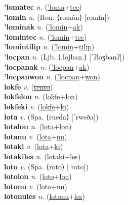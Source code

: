 \textbf{'lomatec} \textit{n.} (\hyperref['loma]{'loma}+\hyperref[tec]{tec})
 \label{'lomatec} \\
\textbf{'lomin} \textit{n.} (Ron. ⟨român⟩ [romɨn])
 \label{'lomin} \\
\textbf{'lominak} \textit{n.} (\hyperref['lomin]{'lomin}+\hyperref[ak]{ak})
 \label{'lominak} \\
\textbf{'lomintec} \textit{n.} (\hyperref['lomin]{'lomin}+\hyperref[tec]{tec})
 \label{'lomintec} \\
\textbf{'lomintilip} \textit{n.} (\hyperref['lomin]{'lomin}+\hyperref[tilip]{tilip})
 \label{'lomintilip} \\
\textbf{'locpan} \textit{n.} (Ljb. ⟨.lojban.⟩ [ˈʔloʒbanʔ])
 \label{'locpan} \\
\textbf{'locpanak} \textit{n.} (\hyperref['locpan]{'locpan}+\hyperref[ak]{ak})
 \label{'locpanak} \\
\textbf{'locpanwon} \textit{n.} (\hyperref['locpan]{'locpan}+\hyperref[won]{won})
 \label{'locpanwon} \\
\textbf{lokfe} \textit{v.} (\hyperref[tenso]{\sout{tenso}})
 \label{lokfe} \\
\textbf{lokfelon} \textit{n.} (\hyperref[lokfe]{lokfe}+\hyperref[lon]{lon})
 \label{lokfelon} \\
\textbf{lokfeki} \textit{v.} (\hyperref[lokfe]{lokfe}+\hyperref[ki]{ki})
 \label{lokfeki} \\
\textbf{lota} \textit{v.} (Spa. ⟨rueda⟩ [ˈrweða])
 \label{lota} \\
\textbf{lotalon} \textit{n.} (\hyperref[lota]{lota}+\hyperref[lon]{lon})
 \label{lotalon} \\
\textbf{lotanu} \textit{v.} (\hyperref[lota]{lota}+\hyperref[nu]{nu})
 \label{lotanu} \\
\textbf{lotaki} \textit{v.} (\hyperref[lota]{lota}+\hyperref[ki]{ki})
 \label{lotaki} \\
\textbf{lotakiles} \textit{n.} (\hyperref[lotaki]{lotaki}+\hyperref[les]{les})
 \label{lotakiles} \\
\textbf{loto} \textit{v.} (Spa. ⟨roto⟩ [ˈroto])
 \label{loto} \\
\textbf{lotolon} \textit{n.} (\hyperref[loto]{loto}+\hyperref[lon]{lon})
 \label{lotolon} \\
\textbf{lotonu} \textit{v.} (\hyperref[loto]{loto}+\hyperref[nu]{nu})
 \label{lotonu} \\
\textbf{lotonules} \textit{n.} (\hyperref[lotonu]{lotonu}+\hyperref[les]{les})
 \label{lotonules} \\
